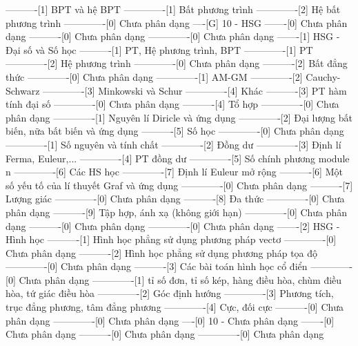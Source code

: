----------[1] BPT và hệ BPT
-------------[1] Bất phương trình
-------------[2] Hệ bất phương trình
-------------[0] Chưa phân dạng
----[G] 10 - HSG
-------[0] Chưa phân dạng
----------[0] Chưa phân dạng
-------------[0] Chưa phân dạng
-------[1] HSG - Đại số và Số học 
----------[1] PT, Hệ phương trình, BPT
-------------[1] PT 
-------------[2] Hệ phương trình 
-------------[0] Chưa phân dạng
----------[2] Bất đẳng thức
-------------[0] Chưa phân dạng
-------------[1] AM-GM
-------------[2] Cauchy-Schwarz
-------------[3] Minkowski và Schur
-------------[4] Khác
----------[3] PT hàm tính đại số
-------------[0] Chưa phân dạng
----------[4] Tổ hợp 
-------------[0] Chưa phân dạng
-------------[1] Nguyên lí Diricle và ứng dụng
-------------[2] Đại lượng bất biến, nữa bất biến và ứng dụng
----------[5] Số học 
-------------[0] Chưa phân dạng
-------------[1] Số nguyên và tính chất
-------------[2] Đồng dư
-------------[3] Định lí Ferma, Euleur,...
-------------[4] PT đồng dư
-------------[5] Số chính phương module n
-------------[6] Các HS học
-------------[7] Định lí Euleur mở rộng
----------[6] Một số yếu tố của lí thuyết Graf và ứng dụng
-------------[0] Chưa phân dạng
----------[7] Lượng giác
-------------[0] Chưa phân dạng
----------[8] Đa thức
-------------[0] Chưa phân dạng
----------[9] Tập hợp, ánh xạ (không giới hạn)
-------------[0] Chưa phân dạng
----------[0] Chưa phân dạng
-------------[0] Chưa phân dạng
-------[2] HSG - Hình học
----------[1] Hình học phẳng sử dụng phương pháp vectơ
-------------[0] Chưa phân dạng
----------[2] Hình học phẳng sử dụng phương pháp tọa độ
-------------[0] Chưa phân dạng
----------[3] Các bài toán hình học cổ điển
-------------[0] Chưa phân dạng
-------------[1] tỉ số đơn, tỉ số kép, hàng điều hòa, chùm điều hòa, tứ giác điều hòa
-------------[2] Góc định hướng
-------------[3] Phương tích, trục đẳng phương, tâm đẳng phương
-------------[4] Cực, đối cực
----------[0] Chưa phân dạng
-------------[0] Chưa phân dạng
----[0] 10 - Chưa phân dạng
-------[0] Chưa phân dạng
----------[0] Chưa phân dạng
-------------[0] Chưa phân dạng

